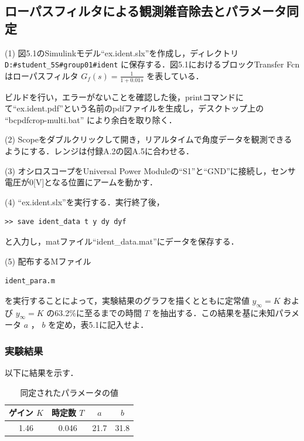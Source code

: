 \subsection{ローパスフィルタによる観測雑音除去とパラメータ同定}

(1) 図5.1のSimulinkモデル“ex.ident.slx”を作成し，ディレクトリ \texttt{D:\#student\_5S\#group01\#ident} に保存する．図5.1におけるブロックTransfer Fcnはローパスフィルタ \( G_f(s) = \frac{1}{1 + 0.01s} \) を表している．

ビルドを行い，エラーがないことを確認した後，printコマンドにて“ex.ident.pdf”という名前のpdfファイルを生成し，デスクトップ上の “bcpdfcrop-multi.bat” により余白を取り除く．

(2) Scopeをダブルクリックして開き，リアルタイムで角度データを観測できるようにする．レンジは付録A.2の図A.5に合わせる．

(3) オシロスコープをUniversal Power Moduleの“S1”と“GND”に接続し，センサ電圧が0[V]となる位置にアームを動かす．

(4) “ex.ident.slx”を実行する．実行終了後，
\begin{verbatim}
>> save ident_data t y dy dyf
\end{verbatim}
と入力し，matファイル“ident\_data.mat”にデータを保存する．

(5) 配布するMファイル
\begin{verbatim}
ident_para.m
\end{verbatim}
を実行することによって，実験結果のグラフを描くとともに定常値 \( y_{\infty} = K \) および \( y_{\infty} = K \) の63.2\%に至るまでの時間 \( T \) を抽出する．この結果を基に未知パラメータ \( a \) ， \( b \) を定め，表5.1に記入せよ．


\subsubsection{実験結果}
以下に結果を示す．

\begin{table}[h]
  \centering
  \caption{同定されたパラメータの値}
  \begin{tabular}{|c|c|c|c|}
    \hline
    ゲイン \( K \) & 時定数 \( T \) & \( a \) & \( b \) \\ \hline
    1.46           & 0.046          & 21.7    & 31.8    \\ \hline
  \end{tabular}
\end{table}

